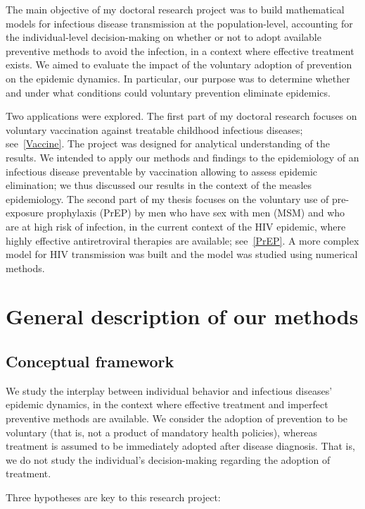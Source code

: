 The main objective of my doctoral research project was to build mathematical models for infectious disease transmission at the population-level, accounting for the individual-level decision-making on whether or not to adopt available preventive methods to avoid the infection, in a context where effective treatment exists. We aimed to evaluate the impact of the voluntary adoption of prevention on the epidemic dynamics. In particular, our purpose was to determine whether and under what conditions could voluntary prevention eliminate epidemics.

Two applications were explored. The first part of my doctoral research focuses on voluntary vaccination against treatable childhood infectious diseases; see~\autoref{Vaccine}. The project was designed for analytical understanding of the results. We intended to apply our methods and findings to the epidemiology of an infectious disease preventable by vaccination allowing to assess epidemic elimination; we thus discussed our results in the context of the measles epidemiology. The second part of my thesis focuses on the voluntary use of pre-exposure prophylaxis (PrEP) by men who have sex with men (MSM) and who are at high risk of infection, in the current context of the HIV epidemic, where highly effective antiretroviral therapies are available; see~\autoref{PrEP}. A more complex model for HIV transmission was built and the model was studied using numerical methods.



\section{General description of our methods}

\subsection{Conceptual framework}
\label{Intro:Framework} 

We study the interplay between individual behavior and infectious diseases' epidemic dynamics, in the context where effective treatment and imperfect preventive methods are available. We consider the adoption of prevention to be voluntary (that is, not a product of mandatory health policies), whereas treatment is assumed to be immediately adopted after disease diagnosis. That is, we do not study the individual's decision-making regarding the adoption of treatment. 

Three hypotheses are key to this research project:

